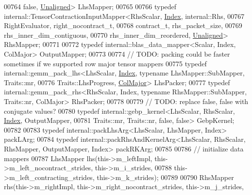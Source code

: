 \begin{DoxyCode}
00764                                                    \textcolor{keyword}{false}, \hyperlink{group__enums_gga45fe06e29902b7a2773de05ba27b47a1ac935220b4c844108e183ebe30a4d5204}{Unaligned}> LhsMapper;
00765 
00766     \textcolor{keyword}{typedef} internal::TensorContractionInputMapper<RhsScalar, \hyperlink{namespace_eigen_a62e77e0933482dafde8fe197d9a2cfde}{Index}, internal::Rhs,
00767                                                    RightEvaluator, right\_nocontract\_t,
00768                                                    contract\_t, rhs\_packet\_size,
00769                                                    rhs\_inner\_dim\_contiguous,
00770                                                    rhs\_inner\_dim\_reordered, 
      \hyperlink{group__enums_gga45fe06e29902b7a2773de05ba27b47a1ac935220b4c844108e183ebe30a4d5204}{Unaligned}> RhsMapper;
00771 
00772     \textcolor{keyword}{typedef} internal::blas\_data\_mapper<Scalar, Index, ColMajor> OutputMapper;
00773 
00774     \textcolor{comment}{// TODO: packing could be faster sometimes if we supported row major tensor mappers}
00775     \textcolor{keyword}{typedef} internal::gemm\_pack\_lhs<LhsScalar, \hyperlink{namespace_eigen_a62e77e0933482dafde8fe197d9a2cfde}{Index}, \textcolor{keyword}{typename} LhsMapper::SubMapper, Traits::mr,
00776                                     Traits::LhsProgress, \hyperlink{group__enums_ggaacded1a18ae58b0f554751f6cdf9eb13a0cbd4bdd0abcfc0224c5fcb5e4f6669a}{ColMajor}> LhsPacker;
00777     \textcolor{keyword}{typedef} internal::gemm\_pack\_rhs<RhsScalar, Index, typename RhsMapper::SubMapper, Traits::nr, ColMajor> 
      RhsPacker;
00778 
00779     \textcolor{comment}{// TODO: replace false, false with conjugate values?}
00780     \textcolor{keyword}{typedef} internal::gebp\_kernel<LhsScalar, RhsScalar, \hyperlink{namespace_eigen_a62e77e0933482dafde8fe197d9a2cfde}{Index}, OutputMapper,
00781                                   Traits::mr, Traits::nr, \textcolor{keyword}{false}, \textcolor{keyword}{false}> GebpKernel;
00782 
00783     \textcolor{keyword}{typedef} internal::packLhsArg<LhsScalar, LhsMapper, Index> packLArg;
00784     \textcolor{keyword}{typedef} internal::packRhsAndKernelArg<LhsScalar, RhsScalar, RhsMapper, OutputMapper, Index> packRKArg;
00785 
00786     \textcolor{comment}{// initialize data mappers}
00787     LhsMapper lhs(this->m\_leftImpl, this->m\_left\_nocontract\_strides, this->m\_i\_strides,
00788                   this->m\_left\_contracting\_strides, this->m\_k\_strides);
00789 
00790     RhsMapper rhs(this->m\_rightImpl, this->m\_right\_nocontract\_strides, this->m\_j\_strides,

\end{DoxyCode}
